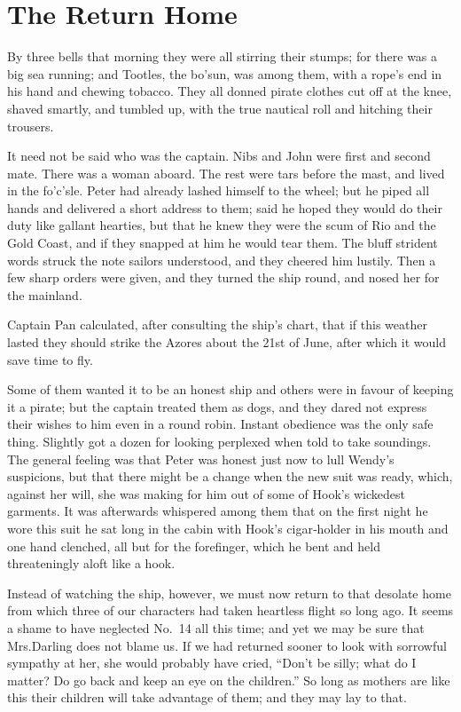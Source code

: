 
\chapter{The Return Home}

By three bells that morning they were all stirring their stumps;
for there was a big sea running;
and Tootles, the bo’sun, was among them,
with a rope’s end in his hand and chewing tobacco.
They all donned pirate clothes cut off at the knee,
shaved smartly, and tumbled up,
with the true nautical roll and hitching their trousers.

It need not be said who was the captain.
Nibs and John were first and second mate.
There was a woman aboard.
The rest were tars before the mast, and lived in the fo’c’sle.
Peter had already lashed himself to the wheel;
but he piped all hands and delivered a short address to them;
said he hoped they would do their duty like gallant hearties,
but that he knew they were the scum of Rio and the Gold Coast,
and if they snapped at him he would tear them.
The bluff strident words struck the note sailors understood,
and they cheered him lustily.
Then a few sharp orders were given,
and they turned the ship round, and nosed her for the mainland.

Captain Pan calculated, after consulting the ship’s chart,
that if this weather lasted they should strike the Azores about the 21st of June,
after which it would save time to fly.

Some of them wanted it to be an honest ship and others were in favour of keeping it a pirate;
but the captain treated them as dogs,
and they dared not express their wishes to him even in a round robin.
Instant obedience was the only safe thing.
Slightly got a dozen for looking perplexed when told to take soundings.
The general feeling was that Peter was honest just now to lull Wendy’s suspicions,
but that there might be a change when the new suit was ready,
which, against her will, she was making for him out of some of Hook’s wickedest garments.
It was afterwards whispered among them that on the first night he wore this suit
he sat long in the cabin with Hook’s cigar‐holder in his mouth and one hand clenched,
all but for the forefinger, which he bent and held threateningly aloft like a hook.

Instead of watching the ship, however,
we must now return to that desolate home from which three of our characters had taken heartless flight so long ago.
It seems a shame to have neglected No.~14 all this time;
and yet we may be sure that Mrs.\@ Darling does not blame us.
If we had returned sooner to look with sorrowful sympathy at her, she would probably have cried,
“Don’t be silly;
what do I matter?
Do go back and keep an eye on the children.”
So long as mothers are like this their children will take advantage of them;
and they may lay to that.

